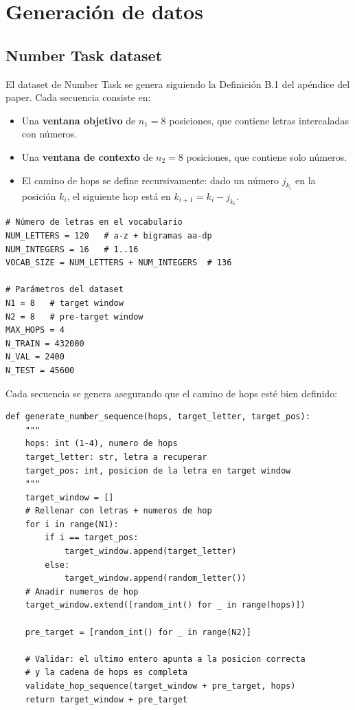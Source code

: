 \documentclass[12pt,a4paper,oneside]{report}
\begin{document}
\section{Generación de datos}

\subsection{Number Task dataset}

El dataset de Number Task se genera siguiendo la Definición B.1 del apéndice del paper. Cada secuencia consiste en:

\begin{itemize}
    \item Una \textbf{ventana objetivo} de $n_1 = 8$ posiciones, que contiene letras intercaladas con números.
    \item Una \textbf{ventana de contexto} de $n_2 = 8$ posiciones, que contiene solo números.
    \item El camino de hops se define recursivamente: dado un número $j_{k_i}$ en la posición $k_i$, el siguiente hop está en $k_{i+1} = k_i - j_{k_i}$.
\end{itemize}

\begin{lstlisting}
# Número de letras en el vocabulario
NUM_LETTERS = 120   # a-z + bigramas aa-dp
NUM_INTEGERS = 16   # 1..16
VOCAB_SIZE = NUM_LETTERS + NUM_INTEGERS  # 136

# Parámetros del dataset
N1 = 8   # target window
N2 = 8   # pre-target window
MAX_HOPS = 4
N_TRAIN = 432000
N_VAL = 2400
N_TEST = 45600
\end{lstlisting}

Cada secuencia se genera asegurando que el camino de hops esté bien definido:

\begin{lstlisting}
def generate_number_sequence(hops, target_letter, target_pos):
    """
    hops: int (1-4), numero de hops
    target_letter: str, letra a recuperar
    target_pos: int, posicion de la letra en target window
    """
    target_window = []
    # Rellenar con letras + numeros de hop
    for i in range(N1):
        if i == target_pos:
            target_window.append(target_letter)
        else:
            target_window.append(random_letter())
    # Anadir numeros de hop
    target_window.extend([random_int() for _ in range(hops)])

    pre_target = [random_int() for _ in range(N2)]

    # Validar: el ultimo entero apunta a la posicion correcta
    # y la cadena de hops es completa
    validate_hop_sequence(target_window + pre_target, hops)
    return target_window + pre_target
\end{lstlisting}
\end{document}
